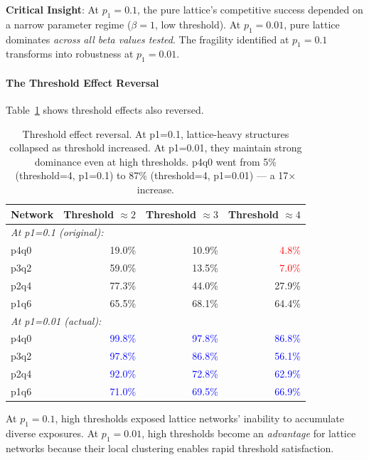 \documentclass[12pt,a4paper]{article}
\begin{document}
\textbf{Critical Insight}: At $p_1=0.1$, the pure lattice's competitive success depended on a narrow parameter regime ($\beta=1$, low threshold). At $p_1=0.01$, pure lattice dominates \textit{across all beta values tested}. The fragility identified at $p_1=0.1$ transforms into robustness at $p_1=0.01$.

\paragraph{The Threshold Effect Reversal}

Table~\ref{tab:threshold_reversal} shows threshold effects also reversed.

\begin{table}[H]
\centering
\begin{tabular}{@{}lrrr@{}}
\toprule
\textbf{Network} & \textbf{Threshold $\approx 2$} & \textbf{Threshold $\approx 3$} & \textbf{Threshold $\approx 4$} \\
\midrule
\multicolumn{4}{l}{\textit{At p1=0.1 (original):}} \\
p4q0 & 19.0\% & 10.9\% & \textcolor{red}{4.8\%} \\
p3q2 & 59.0\% & 13.5\% & \textcolor{red}{7.0\%} \\
p2q4 & 77.3\% & 44.0\% & 27.9\% \\
p1q6 & 65.5\% & 68.1\% & 64.4\% \\
\midrule
\multicolumn{4}{l}{\textit{At p1=0.01 (actual):}} \\
p4q0 & \textcolor{blue}{99.8\%} & \textcolor{blue}{97.8\%} & \textcolor{blue}{86.8\%} \\
p3q2 & \textcolor{blue}{97.8\%} & \textcolor{blue}{86.8\%} & \textcolor{blue}{56.1\%} \\
p2q4 & \textcolor{blue}{92.0\%} & \textcolor{blue}{72.8\%} & \textcolor{blue}{62.9\%} \\
p1q6 & \textcolor{blue}{71.0\%} & \textcolor{blue}{69.5\%} & \textcolor{blue}{66.9\%} \\
\bottomrule
\end{tabular}
\caption{Threshold effect reversal. At p1=0.1, lattice-heavy structures collapsed as threshold increased. At p1=0.01, they maintain strong dominance even at high thresholds. p4q0 went from 5\% (threshold=4, p1=0.1) to 87\% (threshold=4, p1=0.01) --- a 17× increase.}
\label{tab:threshold_reversal}
\end{table}

At $p_1=0.1$, high thresholds exposed lattice networks' inability to accumulate diverse exposures. At $p_1=0.01$, high thresholds become an \textit{advantage} for lattice networks because their local clustering enables rapid threshold satisfaction.
\end{document}
